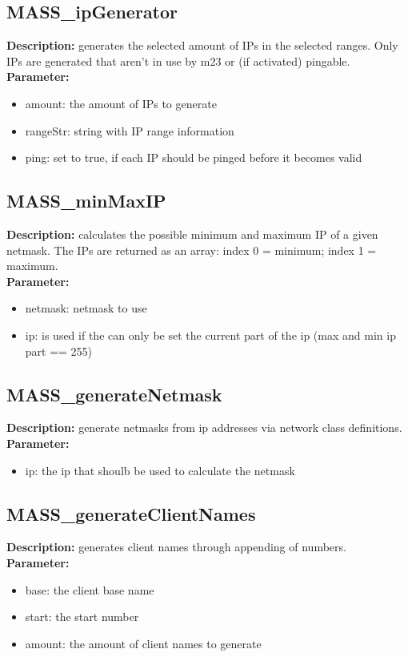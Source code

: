 \subsection{MASS\_ipGenerator}
\textbf{Description:} generates the selected amount of IPs in the selected ranges. Only IPs are generated that aren't in use by m23 or (if activated) pingable.\\
\textbf{Parameter:}
\begin{itemize}
\item amount: the amount of IPs to generate
\item rangeStr: string with IP range information
\item ping: set to true, if each IP should be pinged before it becomes valid
\end{itemize}

\subsection{MASS\_minMaxIP}
\textbf{Description:} calculates the possible minimum and maximum IP of a given netmask. The IPs are returned as an array: index 0 = minimum; index 1 = maximum.\\
\textbf{Parameter:}
\begin{itemize}
\item netmask: netmask to use
\item ip: is used if the can only be set the current part of the ip (max and min ip part == 255)
\end{itemize}

\subsection{MASS\_generateNetmask}
\textbf{Description:} generate netmasks from ip addresses via network class definitions.\\
\textbf{Parameter:}
\begin{itemize}
\item ip: the ip that shoulb be used to calculate the netmask
\end{itemize}

\subsection{MASS\_generateClientNames}
\textbf{Description:} generates client names through appending of numbers.\\
\textbf{Parameter:}
\begin{itemize}
\item base: the client base name
\item start: the start number
\item amount: the amount of client names to generate
\end{itemize}

